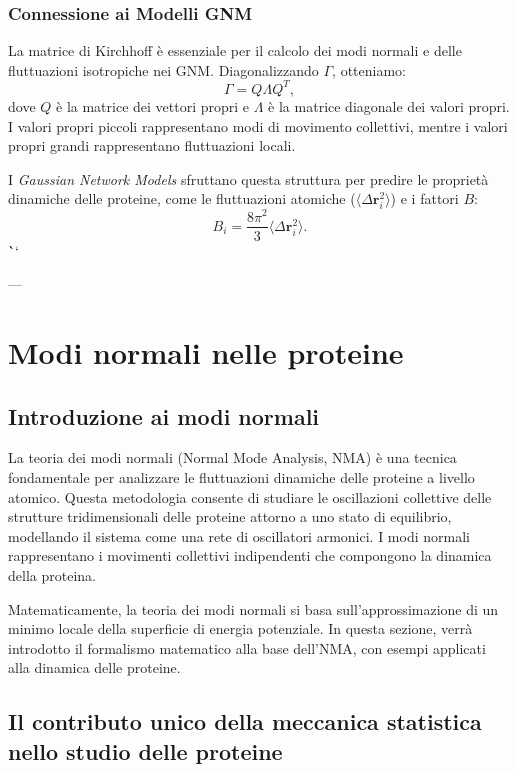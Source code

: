 \documentclass[Lau,binding=0.6cm,oneside,noexaminfo]{sapthesis}
\begin{document}
\subsection{Connessione ai Modelli GNM}
La matrice di Kirchhoff è essenziale per il calcolo dei modi normali e delle fluttuazioni isotropiche nei GNM. Diagonalizzando \( \Gamma \), otteniamo:
\begin{equation}
    \Gamma = Q \Lambda Q^T,
\end{equation}
dove \( Q \) è la matrice dei vettori propri e \( \Lambda \) è la matrice diagonale dei valori propri. I valori propri piccoli rappresentano modi di movimento collettivi, mentre i valori propri grandi rappresentano fluttuazioni locali.

I \emph{Gaussian Network Models} sfruttano questa struttura per predire le proprietà dinamiche delle proteine, come le fluttuazioni atomiche (\( \langle \Delta \mathbf{r}_i^2 \rangle \)) e i fattori \( B \):
\begin{equation}
    B_i = \frac{8\pi^2}{3} \langle \Delta \mathbf{r}_i^2 \rangle.
\end{equation}
\```

---
\chapter{Modi normali nelle proteine}

\section*{Introduzione ai modi normali}
La teoria dei modi normali (Normal Mode Analysis, NMA) è una tecnica fondamentale per analizzare le fluttuazioni dinamiche delle proteine a livello atomico. Questa metodologia consente di studiare le oscillazioni collettive delle strutture tridimensionali delle proteine attorno a uno stato di equilibrio, modellando il sistema come una rete di oscillatori armonici. I modi normali rappresentano i movimenti collettivi indipendenti che compongono la dinamica della proteina.

Matematicamente, la teoria dei modi normali si basa sull'approssimazione di un minimo locale della superficie di energia potenziale. In questa sezione, verrà introdotto il formalismo matematico alla base dell'NMA, con esempi applicati alla dinamica delle proteine.

\section{Il contributo unico della meccanica statistica nello studio delle proteine}
\end{document}
